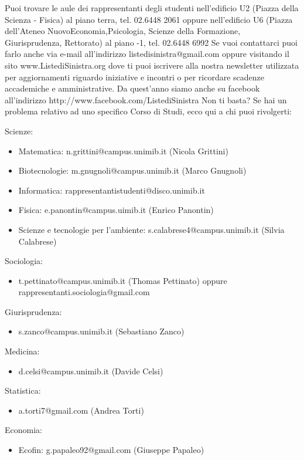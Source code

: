 Puoi trovare le aule dei rappresentanti degli studenti  nell'edificio U2 (Piazza della Scienza - Fisica) al piano terra, tel. 02.6448 2061 oppure nell'edificio U6 (Piazza dell'Ateneo NuovoEconomia,Psicologia, Scienze della Formazione, Giurisprudenza, Rettorato) al piano -1, tel. 02.6448 6992
Se vuoi contattarci puoi farlo anche via e-mail all’indirizzo listedisinistra@gmail.com oppure visitando il sito www.ListediSinistra.org dove ti puoi iscrivere alla nostra newsletter utilizzata per aggiornamenti riguardo iniziative e incontri o per ricordare scadenze accademiche e amministrative.
Da quest'anno siamo anche su facebook all'indirizzo http://www.facebook.com/ListediSinistra 
Non ti basta? Se hai un problema relativo ad uno specifico Corso di Studi, ecco qui a chi puoi rivolgerti:

Scienze:
\begin{itemize}
\item Matematica: n.grittini@campus.unimib.it (Nicola Grittini)
\item Biotecnologie: m.gnugnoli@campus.unimib.it (Marco Gnugnoli)
\item Informatica: rappresentantistudenti@disco.unimib.it
\item Fisica: e.panontin@campus.uimib.it (Enrico Panontin)
\item Scienze e tecnologie per l'ambiente: s.calabrese4@campus.unimib.it (Silvia Calabrese)
\end{itemize}   
Sociologia: 
\begin{itemize}
\item t.pettinato@campus.unimib.it (Thomas Pettinato) oppure rappresentanti.sociologia@gmail.com
\end{itemize}
Giurisprudenza:
\begin{itemize}
\item s.zanco@campus.unimib.it (Sebastiano Zanco)
\end{itemize}   
Medicina: 
\begin{itemize}
\item d.celsi@campus.unimib.it (Davide Celsi)
\end{itemize}   
Statistica: 
\begin{itemize}
\item a.torti7@gmail.com (Andrea Torti)
\end{itemize}
Economia: 
\begin{itemize}
\item Ecofin: g.papaleo92@gmail.com (Giuseppe Papaleo)
\end{itemize}
